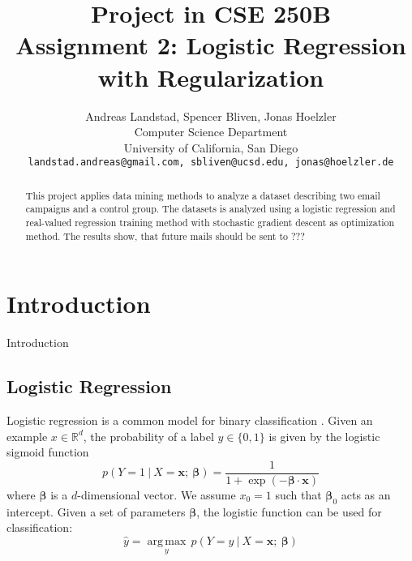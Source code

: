 \documentclass[10pt,twocolumn,letterpaper]{article}
\begin{document}
\title{
Project in CSE 250B\\
Assignment 2: Logistic Regression with Regularization}

\author{Andreas Landstad, Spencer Bliven, Jonas Hoelzler\\
Computer Science Department\\
University of California, San Diego\\
{\tt\small landstad.andreas@gmail.com, sbliven@ucsd.edu, jonas@hoelzler.de}
}%
\maketitle
\thispagestyle{empty}

\begin{abstract}
This project applies data mining methods to analyze a dataset describing two email campaigns and a control group. The datasets is analyzed using a logistic regression and real-valued regression training method with stochastic gradient descent as optimization method.
The results show, that future mails should be sent to ???
\end{abstract}

\section{Introduction}
Introduction
\subsection{Logistic Regression}

\renewcommand{\b}{\boldsymbol{\beta}}

Logistic regression is a common model for binary classification \cite{bishop06}. Given an example $x\in\mathbb{R}^d$, the probability of a label $y\in\{0,1\}$ is given by the logistic sigmoid function
\[p(Y=1\ |\ X=\mathbf{x};\ \b) = \frac{1}{1+\exp(-\b\cdot \mathbf{x})} \]
where $\b$ is a $d$-dimensional vector. We assume $x_0=1$ such that $\b_0$ acts as an intercept.
Given a set of parameters $\b$, the logistic function can be used for classification:
\[ \hat{y} = \operatorname*{arg\,max}_y\,p(Y=y\ |\ X=\mathbf{x};\ \b) \]
\end{document}
